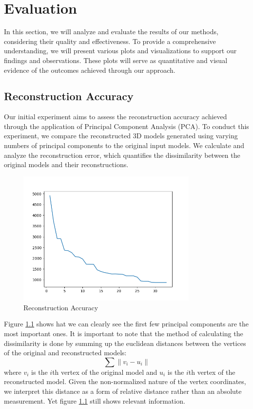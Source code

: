 \chapter{Evaluation}\label{ch04_evaluation}

In this section, we will analyze and evaluate the results of our methods, considering their quality and effectiveness. To provide a comprehensive understanding, 
we will present various plots and visualizations to support our findings and observations. These plots will serve as quantitative and visual evidence of the outcomes achieved through our approach. 

\section{Reconstruction Accuracy}\label{sec:reconstruction_accuracy}

Our initial experiment aims to assess the reconstruction accuracy achieved through the application of Principal Component Analysis (PCA). 
To conduct this experiment, we compare the reconstructed 3D models generated using varying numbers of principal components to the original input models. 
We calculate and analyze the reconstruction error, which quantifies the dissimilarity between the original models and their reconstructions.

\begin{figure}[H]
    \centering
    \includegraphics[width = 0.8\textwidth]{figures/plot_recreation_accuracy.png}
    \caption{Reconstruction Accuracy}
    \label{fig:reconstruction_accuracy}
\end{figure}

Figure \ref{fig:reconstruction_accuracy} shows hat we can clearly see the first few principal components are the most important ones. It is important to note that the method of calculating the dissimilarity is done by summing up
the euclidean distances between the vertices of the original and reconstructed models:
\[\sum \lVert v_i - u_i \rVert\]
where $v_i$ is the $i$th vertex of the original model and $u_i$ is the $i$th vertex of the reconstructed model. Given the non-normalized nature of the vertex coordinates, 
we interpret this distance as a form of relative distance rather than an absolute measurement. Yet figure \ref{fig:reconstruction_accuracy} still shows relevant information.


